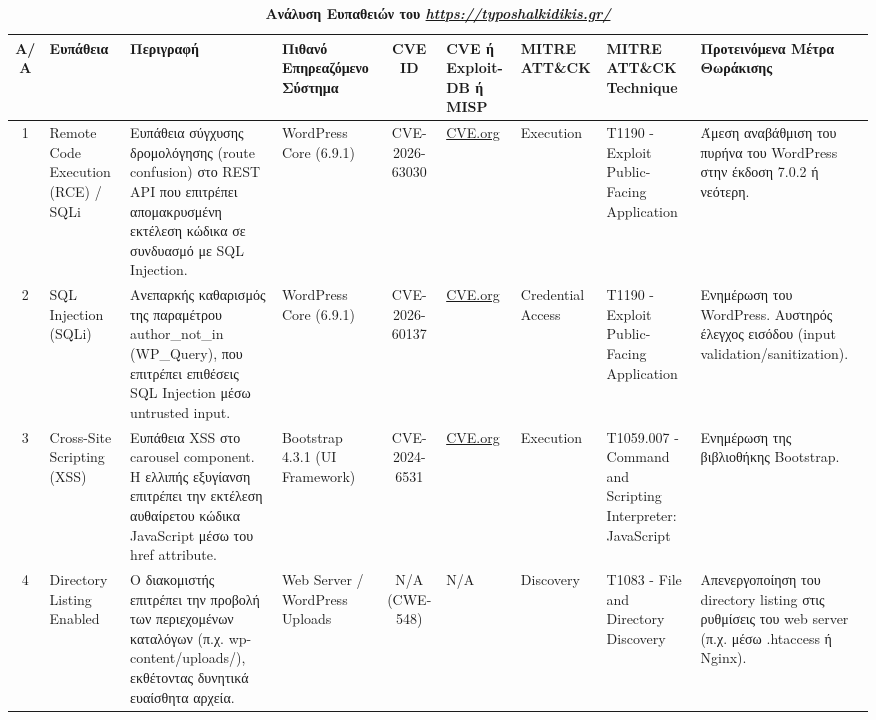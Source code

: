 \documentclass[12pt, a4paper]{article}
\begin{document}
\begin{landscape}
\begin{table}[ht]
\caption{\textbf{Ανάλυση Ευπαθειών του \textit{\href{https://typoshalkidikis.gr/}{https://typoshalkidikis.gr/}}}}
\label{tab:3}
\centering
\small
\renewcommand{\arraystretch}{1.5}
\begin{tabularx}{\linewidth}{|c|p{2.2cm}|X|p{2cm}|c|p{2.2cm}|p{2cm}|p{3.5cm}|X|}
\hline
\rowcolor{tablehead}
\textbf{Α/Α} & \textbf{Ευπάθεια} & \textbf{Περιγραφή} & \textbf{Πιθανό Επηρεαζόμενο Σύστημα} & \textbf{CVE ID} & \textbf{CVE ή Exploit-DB ή MISP} & \textbf{MITRE ATT\&CK} & \textbf{MITRE ATT\&CK Technique} & \textbf{Προτεινόμενα Μέτρα Θωράκισης} \\
\hline
1 & Remote Code Execution (RCE) / SQLi & Ευπάθεια σύγχυσης δρομολόγησης (route confusion) στο REST API που επιτρέπει απομακρυσμένη εκτέλεση κώδικα σε συνδυασμό με SQL Injection. & WordPress Core (6.9.1) & CVE-2026-63030 & \href{https://www.cve.org/CVERecord?id=CVE-2026-63030}{CVE.org} & Execution & T1190 - Exploit Public-Facing Application & Άμεση αναβάθμιση του πυρήνα του WordPress στην έκδοση 7.0.2 ή νεότερη. \\
\hline
2 & SQL Injection (SQLi) & Ανεπαρκής καθαρισμός της παραμέτρου author\_not\_in (WP\_Query), που επιτρέπει επιθέσεις SQL Injection μέσω untrusted input. & WordPress Core (6.9.1) & CVE-2026-60137 & \href{https://www.cve.org/CVERecord?id=CVE-2026-60137}{CVE.org} & Credential Access & T1190 - Exploit Public-Facing Application & Ενημέρωση του WordPress. Αυστηρός έλεγχος εισόδου (input validation/sanitization). \\
\hline
3 & Cross-Site Scripting (XSS) & Ευπάθεια XSS στο carousel component. Η ελλιπής εξυγίανση επιτρέπει την εκτέλεση αυθαίρετου κώδικα JavaScript μέσω του href attribute. & Bootstrap 4.3.1 (UI Framework) & CVE-2024-6531 & \href{https://www.cve.org/CVERecord?id=CVE-2024-6531}{CVE.org} & Execution & T1059.007 - Command and Scripting Interpreter: JavaScript & Ενημέρωση της βιβλιοθήκης Bootstrap. \\
\hline
4 & Directory Listing Enabled & Ο διακομιστής επιτρέπει την προβολή των περιεχομένων καταλόγων (π.χ. wp-content/uploads/), εκθέτοντας δυνητικά ευαίσθητα αρχεία. & Web Server / WordPress Uploads & N/A (CWE-548) & N/A & Discovery & T1083 - File and Directory Discovery & Απενεργοποίηση του directory listing στις ρυθμίσεις του web server (π.χ. μέσω .htaccess ή Nginx). \\
\hline
\end{tabularx}
\end{table}


\end{landscape}
\end{document}
